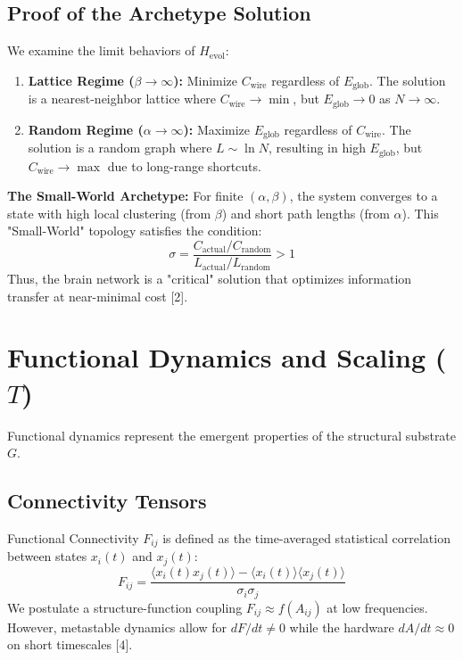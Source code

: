 \documentclass[11pt,fleqn]{article}
\begin{document}
\subsection{Proof of the Archetype Solution}
We examine the limit behaviors of $H_{\text{evol}}$:
\begin{enumerate}
    \item \textbf{Lattice Regime ($\beta \to \infty$):} Minimize $C_{\text{wire}}$ regardless of $E_{\text{glob}}$. The solution is a nearest-neighbor lattice where $C_{\text{wire}} \to \min$, but $E_{\text{glob}} \to 0$ as $N \to \infty$.
    \item \textbf{Random Regime ($\alpha \to \infty$):} Maximize $E_{\text{glob}}$ regardless of $C_{\text{wire}}$. The solution is a random graph where $L \sim \ln N$, resulting in high $E_{\text{glob}}$, but $C_{\text{wire}} \to \max$ due to long-range shortcuts.
\end{enumerate}
\textbf{The Small-World Archetype:} For finite $(\alpha, \beta)$, the system converges to a state with high local clustering (from $\beta$) and short path lengths (from $\alpha$). This "Small-World" topology satisfies the condition:
\begin{equation}
    \sigma = \frac{C_{\text{actual}} / C_{\text{random}}}{L_{\text{actual}} / L_{\text{random}}} > 1
\end{equation}
Thus, the brain network is a "critical" solution that optimizes information transfer at near-minimal cost [2].

\section{Functional Dynamics and Scaling ($T$)}
Functional dynamics represent the emergent properties of the structural substrate $G$.

\subsection{Connectivity Tensors}
Functional Connectivity $F_{ij}$ is defined as the time-averaged statistical correlation between states $x_i(t)$ and $x_j(t)$:
\begin{equation}
    F_{ij} = \frac{\langle x_i(t)x_j(t) \rangle - \langle x_i(t) \rangle \langle x_j(t) \rangle}{\sigma_i \sigma_j}
\end{equation}
We postulate a structure-function coupling $F_{ij} \approx f(A_{ij})$ at low frequencies. However, metastable dynamics allow for $dF/dt \neq 0$ while the hardware $dA/dt \approx 0$ on short timescales [4].
\end{document}
